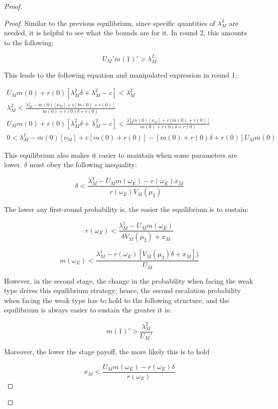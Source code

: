 \documentclass[
  12pt,
]{article}
\theoremstyle{plain}
\theoremstyle{plain}
\theoremstyle{remark}
\begin{document}
\begin{proof}
\begin{proof}
Similar to the previous equilibrium, since specific quantities of
\(\lambda_M^2\) are needed, it is helpful to see what the bounds are for
it. In round 2, this amounts to the following:

\[
U_M' m(1)' >\lambda_M^2
\]

This leads to the following equation and manipulated expression in round
1:

\[
\begin{aligned}
U_M m(0) + r(0)[\lambda_M^2 \delta + \lambda_M^2 - c] < \lambda_M^2\\
\lambda_M^2 < \frac{\lambda_M^1 - m(0)[\nu_M] + c[m(0) + r(0)]}{m(0) + r(0) \delta + r(0) }\\
U_M m(0) + r(0)[\lambda_M^2 \delta + \lambda_M^2- c] < \frac{\lambda_M^1 m(0)[\nu_M] + c[m(0) + r(0)]}{m(0) + r(0) \delta + r(0) } \\
0 < \lambda_M^1 - m(0)[\nu_M] + c[m(0) + r(0)] - [m(0) + r(0) \delta + r(0)] U_M m(0)
\end{aligned}
\]

This equilibrium also makes it easier to maintain when some parameters
are lower. \(\delta\) must obey the following inequality:

\[
\delta < \frac{\lambda_M^1- U_M m(\omega_E) - r(\omega_E) x_M}{r(\omega_E) V_M(\mu_2)}
\]

The lower any first-round probability is, the easier the equilibrium is
to sustain:

\[
r(\omega_E) < \frac{\lambda_M^1- U_M m(\omega_E)}{\delta V_M(\mu_2) + x_M}
\]

\[
m(\omega_E) <  \frac{\lambda_M^1- r(\omega_E)[V_M(\mu_2) \delta + x_M])}{U_M}
\]

However, in the second stage, the change in the probability when facing
the weak type drives this equilibrium strategy; hence, the second
escalation probability when facing the weak type has to hold to the
following structure, and the equilibrium is always easier to sustain the
greater it is:

\[
m(1)' > \frac{\lambda_M^2}{U_M'}
\]

Moreover, the lower the stage payoff, the more likely this is to hold

\[
x_M < \frac{U_M m(\omega_E) - r(\omega_E) \delta}{r(\omega_E)}
\]
\end{proof}

\end{proof}
\end{document}
